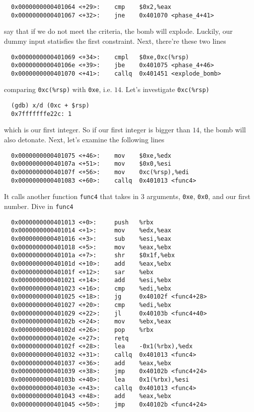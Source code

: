 {\renewcommand\fcolorbox[4][]{\textcolor{cyan}{\strut#4}}
\begin{verbatim}
  0x0000000000401064 <+29>:    cmp    $0x2,%eax
  0x0000000000401067 <+32>:    jne    0x401070 <phase_4+41>
\end{verbatim}
}\noindent
say that if we do not meet the criteria, the bomb will explode. Luckily, our dummy input statisfies the first constraint. Next, there're these two lines
{\renewcommand\fcolorbox[4][]{\textcolor{cyan}{\strut#4}}
\begin{verbatim}
  0x0000000000401069 <+34>:    cmpl   $0xe,0xc(%rsp)
  0x000000000040106e <+39>:    jbe    0x401075 <phase_4+46>
  0x0000000000401070 <+41>:    callq  0x401451 <explode_bomb>
\end{verbatim}
}\noindent
comparing \verb+0xc(%rsp)+ with \verb+0xe+, i.e. $14$. Let's investigate \verb+0xc(%rsp)+
{\renewcommand\fcolorbox[4][]{\textcolor{black}{\strut#4}}
\begin{verbatim}
  (gdb) x/d (0xc + $rsp)
  0x7fffffffe22c: 1
\end{verbatim}
}\noindent
which is our first integer. So if our first integer is bigger than $14$, the bomb will also detonate. Next, let's examine the following lines
{\renewcommand\fcolorbox[4][]{\textcolor{cyan}{\strut#4}}
\begin{verbatim}
  0x0000000000401075 <+46>:    mov    $0xe,%edx
  0x000000000040107a <+51>:    mov    $0x0,%esi
  0x000000000040107f <+56>:    mov    0xc(%rsp),%edi
  0x0000000000401083 <+60>:    callq  0x401013 <func4>
\end{verbatim}
}\noindent
It calls another function \verb+func4+ that takes in $3$ arguments, \verb+0xe+, \verb+0x0+, and our first number. Dive in \verb+func4+
{\renewcommand\fcolorbox[4][]{\textcolor{cyan}{\strut#4}}
\begin{verbatim}
  0x0000000000401013 <+0>:     push   %rbx
  0x0000000000401014 <+1>:     mov    %edx,%eax
  0x0000000000401016 <+3>:     sub    %esi,%eax
  0x0000000000401018 <+5>:     mov    %eax,%ebx
  0x000000000040101a <+7>:     shr    $0x1f,%ebx
  0x000000000040101d <+10>:    add    %eax,%ebx
  0x000000000040101f <+12>:    sar    %ebx
  0x0000000000401021 <+14>:    add    %esi,%ebx
  0x0000000000401023 <+16>:    cmp    %edi,%ebx
  0x0000000000401025 <+18>:    jg     0x40102f <func4+28>
  0x0000000000401027 <+20>:    cmp    %edi,%ebx
  0x0000000000401029 <+22>:    jl     0x40103b <func4+40>
  0x000000000040102b <+24>:    mov    %ebx,%eax
  0x000000000040102d <+26>:    pop    %rbx
  0x000000000040102e <+27>:    retq
  0x000000000040102f <+28>:    lea    -0x1(%rbx),%edx
  0x0000000000401032 <+31>:    callq  0x401013 <func4>
  0x0000000000401037 <+36>:    add    %eax,%ebx
  0x0000000000401039 <+38>:    jmp    0x40102b <func4+24>
  0x000000000040103b <+40>:    lea    0x1(%rbx),%esi
  0x000000000040103e <+43>:    callq  0x401013 <func4>
  0x0000000000401043 <+48>:    add    %eax,%ebx
  0x0000000000401045 <+50>:    jmp    0x40102b <func4+24>
\end{verbatim}
}\noindent
